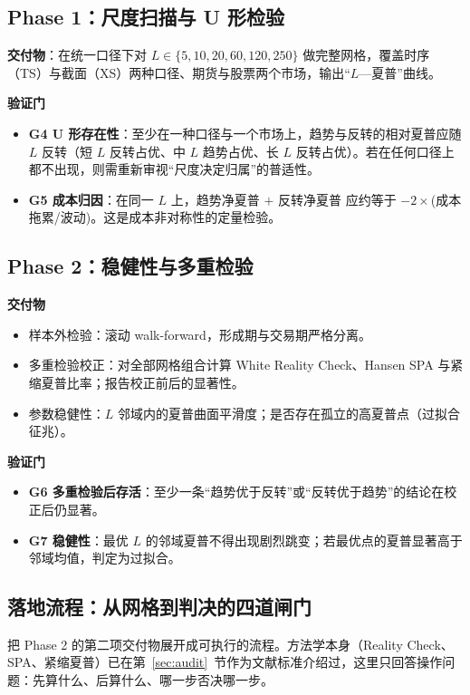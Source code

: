 \subsection{Phase 1：尺度扫描与 U 形检验}

\textbf{交付物}：在统一口径下对 $L\in\{5,10,20,60,120,250\}$ 做完整网格，覆盖时序（TS）与截面（XS）两种口径、期货与股票两个市场，输出“$L$—夏普”曲线。

\textbf{验证门}
\begin{itemize}[leftmargin=2.2em]
  \item \textbf{G4 U 形存在性}：至少在一种口径与一个市场上，趋势与反转的相对夏普应随 $L$ 反转（短 $L$ 反转占优、中 $L$ 趋势占优、长 $L$ 反转占优）。若在任何口径上都不出现，则需重新审视“尺度决定归属”的普适性。
  \item \textbf{G5 成本归因}：在同一 $L$ 上，趋势净夏普 $+$ 反转净夏普 应约等于 $-2\times$(成本拖累/波动)。这是成本非对称性的定量检验。
\end{itemize}

\subsection{Phase 2：稳健性与多重检验}

\textbf{交付物}
\begin{itemize}[leftmargin=2.2em]
  \item 样本外检验：滚动 walk-forward，形成期与交易期严格分离。
  \item 多重检验校正：对全部网格组合计算 White Reality Check、Hansen SPA 与紧缩夏普比率；报告校正前后的显著性。
  \item 参数稳健性：$L$ 邻域内的夏普曲面平滑度；是否存在孤立的高夏普点（过拟合征兆）。
\end{itemize}

\textbf{验证门}
\begin{itemize}[leftmargin=2.2em]
  \item \textbf{G6 多重检验后存活}：至少一条“趋势优于反转”或“反转优于趋势”的结论在校正后仍显著。
  \item \textbf{G7 稳健性}：最优 $L$ 的邻域夏普不得出现剧烈跳变；若最优点的夏普显著高于邻域均值，判定为过拟合。
\end{itemize}

\subsection{落地流程：从网格到判决的四道闸门}

把 Phase 2 的第二项交付物展开成可执行的流程。方法学本身（Reality Check、SPA、紧缩夏普）已在第~\ref{sec:audit}~节作为文献标准介绍过，这里只回答操作问题：先算什么、后算什么、哪一步否决哪一步。

